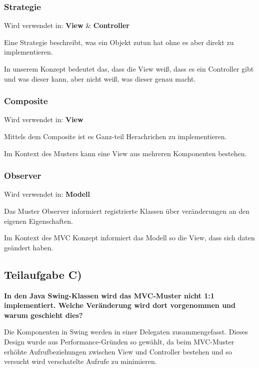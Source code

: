 \subsubsection{Strategie}
Wird verwendet in: \textbf{View} \& \textbf{Controller}

Eine Strategie beschreibt, was ein Objekt zutun hat ohne es aber direkt zu
implementieren. 

In unserem Konzept bedeutet das, dass die View weiß, dass es ein Controller gibt
und was dieser kann, aber nicht weiß, was dieser genau macht.

\subsubsection{Composite}
Wird verwendet in: \textbf{View}

Mittels dem Composite ist es Ganz-teil Herachrichen zu implementieren.

Im Kontext des Musters kann eine View aus mehreren Komponenten bestehen.

\subsubsection{Observer}
Wird verwendet in: \textbf{Modell}

Das Muster Observer informiert registrierte Klassen über veränderungen an den
eigenen Eigenschaften.

Im Kontext des MVC Konzept informiert das Modell so die View, dass sich daten
geändert haben.

\subsection{Teilaufgabe C)}
\textbf{In den Java Swing-Klassen wird das MVC-Muster nicht 1:1 implementiert. Welche
Veränderung wird dort vorgenommen und warum geschieht dies?}

Die Komponenten in Swing werden in einer Delegaten zusammengefasst.
Dieses Design wurde aus Performance-Gründen so gewählt, da beim MVC-Muster
erhöhte Aufrufbeziehungen zwischen View und Controller bestehen und so versucht
wird verschatelte Aufrufe zu minimieren.

\clearpage